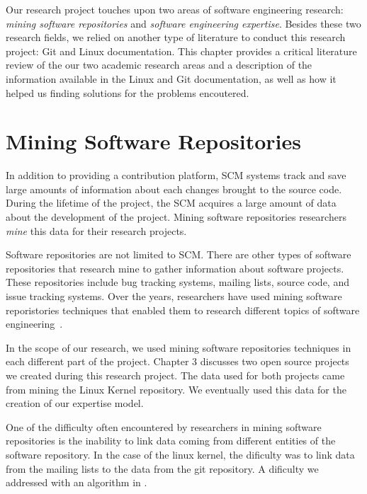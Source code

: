 \label{sec:RevLitt}


Our research project touches upon two areas of software engineering research: \textit{mining software repositories} and \textit{software engineering expertise}. Besides these two research fields, we relied on another type of literature to conduct this research project: Git and Linux documentation. This chapter provides a critical literature review of the our two academic research areas and a description of the information available in the Linux and Git documentation, as well as how it helped us finding solutions for the problems encoutered.



\section{Mining Software Repositories}

In addition to providing a contribution platform, \ac{SCM} systems track and save large amounts of information about each changes brought to the source code. During the lifetime of the project, the \ac{SCM} acquires a large amount of data about the development of the project. Mining software repositories researchers \textit{mine} this data for their research projects. 

Software repositories are not limited to \ac{SCM}. There are other types of software repositories that research mine to gather information about software projects. These repositories include bug tracking systems, mailing lists, source code, and issue tracking systems. Over the years, researchers have used mining software reporistories techniques that enabled them to research different topics of software engineering~\citep{Bird-2009}.

In the scope of our research, we used mining software repositories techniques in each different part of the project. Chapter 3 discusses two open source projects we created during this research project. The data used for both projects came from mining the Linux Kernel repository. We eventually used this data for the creation of our expertise model.

One of the difficulty often encountered by researchers in mining software repositories is the inability to link data coming from different entities of the software repository. In the case of the linux kernel, the dificulty was to link data from the mailing lists to the data from the git repository. A dificulty we addressed with an algorithm in \citep{jiang14}. 

